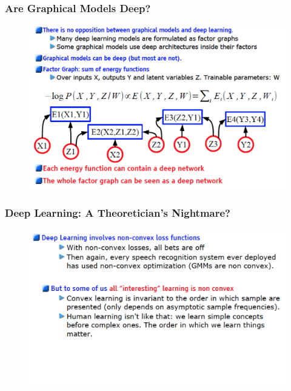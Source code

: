 \documentclass{beamer}
\begin{document}
\begin{frame}
\frametitle{Are Graphical Models Deep?}
\begin{figure}
      \includegraphics[width=1\textwidth]{figs/intro10.png}
\end{figure}
\end{frame}

\begin{frame}
\frametitle{Deep Learning: A Theoretician's Nightmare?}
\begin{figure}
      \includegraphics[width=1\textwidth]{figs/intro11.png}
\end{figure}
\end{frame}
\end{document}
